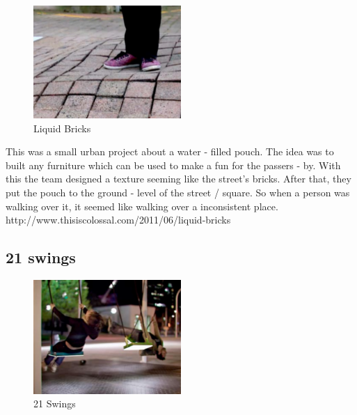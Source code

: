 \begin{figure}[h!]
	\centering
	\includegraphics[width=0.5\textwidth, clip=true, keepaspectratio=true]{./pic/liquid_bricks.png}
	\caption{Liquid Bricks}
	\label{fig:liquid_bricks}
\end{figure}
 
This was a small urban project about a water - filled pouch. \newline
The idea was to built any furniture which can be used to make a fun for the passers - by. With this the team designed a texture seeming like the street's bricks. After that, they put the pouch to the ground - level of the street / square. So when a person was walking over it, it seemed like walking over a inconsistent place.\newline
\newline
http://www.thisiscolossal.com/2011/06/liquid-bricks\newline

\subsection{21 swings}

\begin{figure}[h!]
	\centering
	\includegraphics[width=0.5\textwidth, clip=true, keepaspectratio=true]{./pic/21_swings.png}
	\caption{21 Swings}
	\label{fig:21_swings}
\end{figure}


